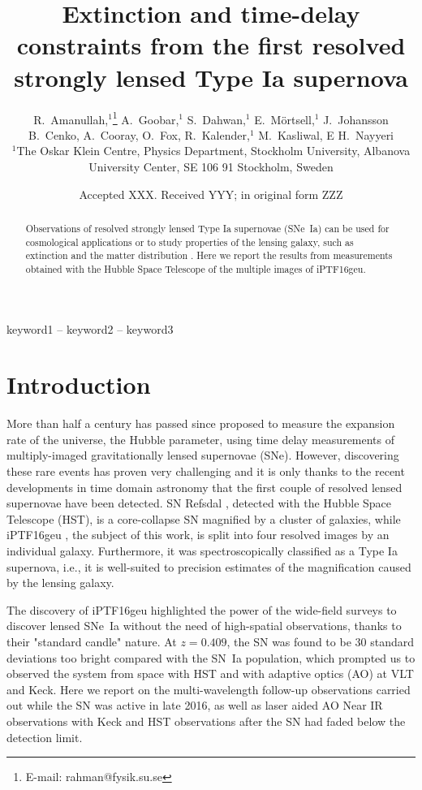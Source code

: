 \documentclass[a4paper,fleqn,usenatbib]{mnras}
\title[Extinction and time-delay constraints from \geu]{Extinction and time-delay constraints from the first resolved strongly lensed Type Ia supernova \geu}
\author[Amanullah et al.]{%
R.~Amanullah,$^{1}$\thanks{E-mail: rahman@fysik.su.se}
A.~Goobar,$^{1}$
S.~Dahwan,$^{1}$ 
E.~M\"ortsell,$^{1}$
J.~Johansson
\newauthor
B.~Cenko,
A.~Cooray,
O.~Fox,
R.~Kalender,$^{1}$
\newauthor
M.~Kasliwal,
E
H.~Nayyeri
\\
$^{1}$The Oskar Klein Centre, Physics Department,
    Stockholm University,
    Albanova University Center, SE 106 91 Stockholm, Sweden\\
}
\date{Accepted XXX. Received YYY; in original form ZZZ}
\newcommand{\geu}{iPTF16geu\xspace}
\newcommand{\sn}{SN\xspace}
\newcommand{\snia}{SN~Ia\xspace}
\newcommand{\sneia}{SNe~Ia\xspace}
\newcommand{\sne}{SNe\xspace}
\begin{document}
\label{firstpage}
\pagerange{\pageref{firstpage}--\pageref{lastpage}}
\maketitle

\begin{abstract}
Observations of resolved strongly lensed Type Ia supernovae (\sneia) can be used for cosmological applications or to study
properties of the lensing galaxy, such as extinction and the matter distribution .  Here we report the results from 
measurements obtained with the Hubble Space Telescope of the multiple images of \geu.
\end{abstract}
\begin{keywords}
keyword1 -- keyword2 -- keyword3
\end{keywords}



\section{Introduction}
More than half a century has passed since
\citet{1964MNRAS.128..307R} proposed  to measure the expansion rate of the universe, the Hubble parameter, using time delay measurements of multiply-imaged gravitationally lensed supernovae (\sne). However, discovering these rare events has proven very challenging and it is only thanks to 
the recent developments in time domain astronomy that the first couple of resolved lensed supernovae have been detected. SN Refsdal \citep{2015Sci...347.1123K}, detected with the Hubble Space Telescope (HST), is a core-collapse \sn magnified by a cluster of galaxies, while 
iPTF16geu \citep{2017Sci...356..291G}, the subject of this work, is split into four resolved images by an individual galaxy. Furthermore, it was spectroscopically classified as a Type Ia supernova,  i.e., it is well-suited to precision estimates of the magnification caused by the lensing galaxy. 

The discovery of iPTF16geu highlighted the power of the wide-field surveys to discover lensed \sneia without the need of high-spatial observations, thanks to their "standard candle" nature. At $z=0.409$, the \sn was found to be 30 standard deviations too bright compared with the \snia population, which prompted us to observed the system from space with HST and with adaptive optics (AO) at VLT and Keck.  Here we report on the multi-wavelength follow-up observations carried out while the \sn was active in late 2016, as well as laser aided AO Near IR observations with Keck and HST observations after the SN had 
faded below the detection limit.
\end{document}
